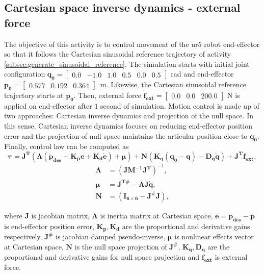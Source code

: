 \graphicspath{{images/act_2.3/}}
\subsection{Cartesian space inverse dynamics - external force}
The objective of this activity is to control movement of the ur5 robot end-effector so that it follows the Cartesian sinusoidal reference trajectory of activity \ref{subsec:generate_sinusoidal_reference}. The simulation starts with initial joint configuration $\mathbf{q_0}=\begin{bmatrix} 0.0 & -1.0 & 1.0 & 0.5 & 0.0 & 0.5 \end{bmatrix}$ rad and end-effector $\mathbf{p_0}=\begin{bmatrix}  0.577 &   0.192 &   0.364 \end{bmatrix}$~m. Likewise, the Cartesian sinusoidal reference trajectory starts at $\mathbf{p_0}$. Then, external force $\mathbf{f_{ext}}=\begin{bmatrix} 0.0 & 0.0 & 200.0\end{bmatrix}$ N is applied on end-effector after $1$ second of simulation. Motion control is made up of two approaches: Cartesian inverse dynamics and projection of the null space. In this sense, Cartesian inverse dynamics focuses on reducing end-effector position error and the projection of null space maintains the articular position close to $\mathbf{q_0}$. Finally, control law can be computed as 
\begin{equation}
	\boldsymbol{\tau}
	= \mathbf{J^T} (\boldsymbol{\Lambda}( \mathbf{\ddot{p}_{des}} + \mathbf{K_p e} + \mathbf{K_d \dot{e}}) + \boldsymbol{\mu})+ \mathbf{N} \left(\mathbf{K_q(q_0-q) - D_q \dot{q}} \right) + \mathbf{J^T}\mathbf{f_{ext}} ,
	\label{eq:cartesian_idyn_N_f_ext}
\end{equation} 
\begin{align*}
	\boldsymbol{\Lambda} &= (\mathbf{J M^{-1} J^{T}})^{-1}, \\
	\boldsymbol{\mu} &= \mathbf{J^{T\#}} - \boldsymbol{\Lambda}\mathbf{\dot{J}\dot{q}}, \\
	\mathbf{N} &=(\mathbf{I_{6 \times 6}} - \mathbf{J^{\#} J} ),
\end{align*}

\noindent where $\mathbf{J}$ is jacobian matrix, $\boldsymbol{\Lambda}$ is inertia matrix at Cartesian space, $\mathbf{e}=\mathbf{p_{des} - p}$ is end-effector position error, $\mathbf{K_p, K_d}$ are the proportional and derivative gains respectively, $\mathbf{J^{\#}}$ is jacobian damped pseudo-inverse, $\boldsymbol{\mu}$ is nonlinear effects vector at Cartesian space, $\mathbf{N}$ is the null space projection of $\mathbf{J^{\#}}$, $\mathbf{K_q, D_q}$ are the proportional and derivative gains for null space projection and $\mathbf{f_{ext}}$ is external force. \vspace{.5cm}

